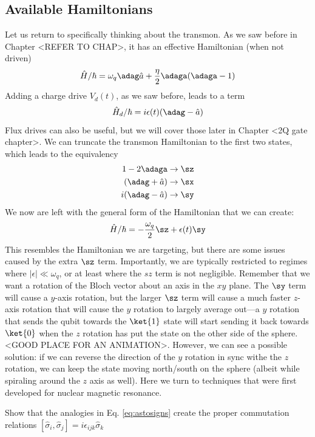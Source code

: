 \subsection{Available Hamiltonians}
Let us return to specifically thinking about the transmon. As we saw before in Chapter <REFER TO CHAP>, it has an effective Hamiltonian (when not driven)
\begin{equation}
    \hat{H}/\hbar = \omega_q \adag \hat{a} + \frac{\eta}{2}\adaga(\adaga-1)
\end{equation}
Adding a charge drive $V_d(t)$, as we saw before, leads to a term
\begin{equation}
    \hat{H}_d/\hbar = i\epsilon(t)(\adag - \hat{a})
\end{equation}
Flux drives can also be useful, but we will cover those later in Chapter <2Q gate chapter>. We can truncate the transmon Hamiltonian to the first two states, which leads to the equivalency 
\begin{align}
\label{eq:astosigs}
1 - 2\adaga &\rightarrow \sz \\
(\adag + \hat{a}) &\rightarrow \sx \\
i(\adag - \hat{a}) &\rightarrow \sy
\end{align}
We now are left with the general form of the Hamiltonian that we can create:
\begin{equation}
\label{eq:qubit-drive-lf}
    \hat{H}/\hbar = -\frac{\omega_q}{2}\sz + \epsilon(t)\sy
\end{equation}
This resembles the Hamiltonian we are targeting, but there are some issues caused by the extra $\sz$ term. Importantly, we are typically restricted to regimes where $|\epsilon|\ll \omega_q$, or at least where the $sz$ term is not negligible. Remember that we want a rotation of the Bloch vector about an axis in the $xy$ plane. The $\sy$ term will cause a $y$-axis rotation, but the larger $\sz$ term will cause a much faster $z$-axis rotation that will cause the $y$ rotation to largely average out---a $y$ rotation that sends the qubit towards the $\ket{1}$ state will start sending it back towards $\ket{0}$ when the $z$ rotation has put the state on the other side of the sphere. <GOOD PLACE FOR AN ANIMATION>. However, we can see a possible solution: if we can reverse the direction of the $y$ rotation in sync withe the $z$ rotation, we can keep the state moving north/south on the sphere (albeit while spiraling around the $z$ axis as well). Here we turn to techniques that were first developed for nuclear magnetic resonance.
\begin{exercise}
    Show that the analogies in Eq. \ref{eq:astosigns} create the proper commutation relations $[\hat{\sigma}_i,\hat{\sigma}_j]=i\epsilon_{ijk}\hat \sigma_k$
\end{exercise}


